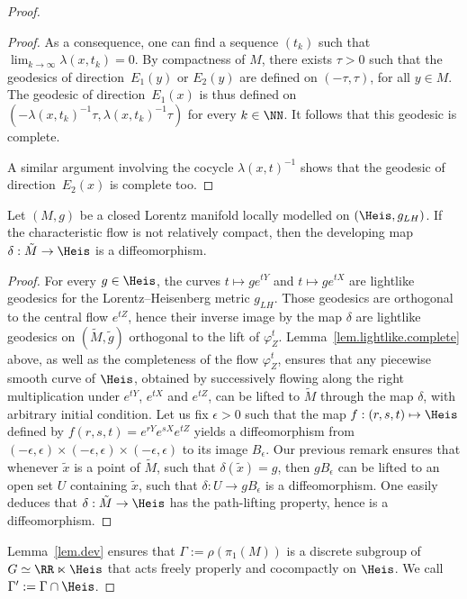 \begin{proof}
\begin{proof}
As a consequence, one can find a sequence $(t_k)$ such that $\lim_{k \to \infty}\lambda(x,t_k)=0$. By compactness of $M$, there exists $\tau>0$ such that the geodesics of direction~$E_1(y)$ or $E_2(y)$ are defined on $(-\tau, \tau)$, for all $y \in M$. The geodesic of direction~$E_1(x)$ is thus defined on $(-\lambda(x,t_k)^{-1} \tau, \lambda(x,t_k)^{-1} \tau)$ for every $k \in \NN$. It follows that this geodesic is complete.

A similar argument involving the cocycle $\lambda(x,t)^{-1}$ shows that the geodesic of direction~$E_2(x)$ is complete too.
\end{proof}


\begin{lemm}\label{lem.dev}
Let $(M,g)$ be a closed Lorentz manifold locally modelled on $(\Heis,g_{LH})$. If the characteristic flow is not relatively compact, then the developing map $\delta: \tilde{M} \to \Heis$ is a diffeomorphism.
\end{lemm}

\begin{proof}
For every $g \in \Heis$, the curves $t \mapsto g e^{tY}$ and $t \mapsto g e^{tX}$ are lightlike geodesics for the Lorentz--Heisenberg metric $g_{LH}$. Those geodesics are orthogonal to the central flow $e^{tZ}$, hence their inverse image by the map $\delta$ are lightlike geodesics on $(\tilde{M},\tilde{g})$ orthogonal to the lift of $\varphi_Z^t$. Lemma~\ref{lem.lightlike.complete} above, as well as the completeness of the flow $\varphi_Z^t$, ensures that any piecewise smooth curve of $\Heis$, obtained by successively flowing along the right multiplication under $e^{tY}$, $e^{tX}$ and $e^{tZ}$, can be lifted to $\tilde{M}$ through the map $\delta$, with arbitrary initial condition. Let us fix $\epsilon >0$ such that the map $f:(r,s,t) \mapsto \Heis$ defined by $f(r,s,t)=e^{rY}e^{sX}e^{tZ}$ yields a diffeomorphism from $(-\epsilon, \epsilon) \times (-\epsilon, \epsilon) \times (-\epsilon, \epsilon)$ to its image $B_{\epsilon}$. Our previous remark ensures that whenever $\tilde{x}$ is a point of $\tilde{M}$, such that $\delta(\tilde{x})=g$, then $gB_{\epsilon}$ can be lifted to an open set $U$ containing $\tilde{x}$, such that $\delta: U \to gB_{\epsilon}$ is a diffeomorphism. One easily deduces that $\delta: \tilde{M} \to \Heis$ has the path-lifting property, hence is a diffeomorphism.
\end{proof}

Lemma~\ref{lem.dev} ensures that $\Gamma:=\rho(\pi_1(M))$ is a discrete subgroup of $G \simeq \RR \ltimes \Heis$ that acts freely properly and cocompactly on $\Heis$. We call $\Gamma':=\Gamma \cap \Heis$.


\end{proof}
